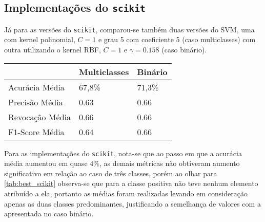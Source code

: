 \subsection{Implementações do \texttt{scikit}}

Já para as versões do \texttt{scikit}, comparou-se também duas versões do SVM,
uma com kernel polinomial, $C = 1$ e grau 5 com coeficiente 5 (caso multiclasses) com
outra utilizando o kernel RBF, $C = 1$ e $\gamma = 0.158$ (caso binário).

\begin{table}[H]
	\centering
	\begin{tabular}{l l l}
	& Multiclasses & Binário \\
	\hline
	Acurácia Média & 67,8\% & 71,3\%  \\
	\hline
	Precisão Média & 0.63 & 0.66  \\
	\hline
	Revocação Média & 0.66 & 0.66 \\
	\hline
	F1-Score Média & 0.64 & 0.66 \\
	\hline
	\end{tabular}
\end{table}

Para as implementações do \texttt{scikit}, nota-se que ao passo em que a acurácia média aumentou em
quase 4\%, as demais métricas não obtiveram aumento significativo em relação ao caso de três classes,
porém ao olhar para \ref{tab:best_scikit} observa-se que para a classe positiva não teve nenhum 
elemento atribuído a ela, portanto as médias foram realizadas levando em consideração apenas as duas
classes predominantes, justificando a semelhança de valores com a apresentada no caso binário.
